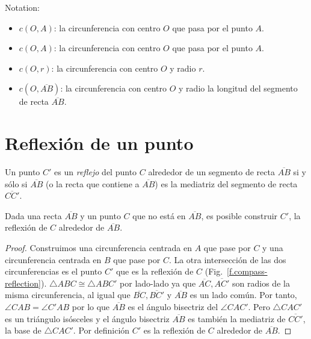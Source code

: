 \noindent{}Notation:
\begin{itemize}
\item $c(O,A)$: la circunferencia con centro $O$ que pasa por el punto $A$.
\item $c(O,A)$: la circunferencia con centro $O$ que pasa por el punto $A$.
\item $c(O,r)$: la circunferencia con centro $O$ y radio $r$.
\item $c(O,\overline{AB})$: la circunferencia con centro $O$ y radio la longitud del segmento de recta $\overline{AB}$.
\end{itemize}


\section{Reflexión de un punto}\label{s.reflection}

\begin{definition}
Un punto $C'$ es un \emph{reflejo} del punto $C$ alrededor de un segmento de recta $\overline{AB}$ si y sólo si $\overline{AB}$ (o la recta que contiene a $\overline{AB}$) es la mediatriz del segmento de recta $\overline{CC'}$.
\end{definition}

\begin{theorem}\label{thm.compass-reflection}
Dada una recta $\overline{AB}$ y un punto $C$ que no está en $\overline{AB}$, es posible construir $C'$, la reflexión de $C$ alrededor de $\overline{AB}$.
\end{theorem}

\begin{proof} 
Construimos una circunferencia centrada en $A$ que pase por $C$ y una circunferencia centrada en $B$ que pase por $C$. La otra intersección de las dos circunferencias es el punto $C'$ que es la reflexión de $C$ (Fig.~\ref{f.compass-reflection}).
$\triangle ABC \cong \triangle ABC'$ por lado-lado ya que $\overline{AC}, \overline{AC'}$ son radios de la misma circunferencia, al igual que $\overline{BC}, \overline{BC'}$ y $\overline{AB}$ es un lado común. Por tanto, $\angle CAB = \angle C'AB$ por lo que $\overline{AB}$ es el ángulo bisectriz del $\angle CAC'$. Pero $\triangle CAC'$ es un triángulo isósceles y el ángulo bisectriz $\overline{AB}$ es también la mediatriz de $\overline{CC'}$, la base de $\triangle CAC'$. Por definición $C'$ es la reflexión de $C$ alrededor de $\overline{AB}$.
\end{proof}

